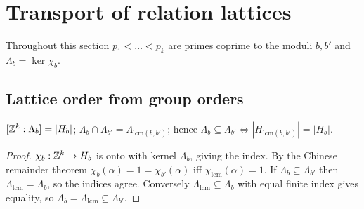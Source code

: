 \section{Transport of relation lattices}\label{sec:lattice}
Throughout this section $p_1<\dots<p_k$ are primes coprime to the moduli $b,b'$ and $\Lambda_b=\ker\chi_b$.

\subsection{Lattice order from group orders}
\begin{proposition}\label{prop:E22}
$[\mathbb Z^k:\Lambda_b]=|H_b|$; $\Lambda_b\cap\Lambda_{b'}=\Lambda_{\mathrm{lcm}(b,b')}$; hence $\Lambda_b\subseteq\Lambda_{b'}\iff|H_{\mathrm{lcm}(b,b')}|=|H_b|$.
\end{proposition}
\begin{proof}
$\chi_b:\mathbb Z^k\to H_b$ is onto with kernel $\Lambda_b$, giving the index. By the Chinese remainder theorem $\chi_b(\alpha)=1=\chi_{b'}(\alpha)$ iff $\chi_{\mathrm{lcm}}(\alpha)=1$. If $\Lambda_b\subseteq\Lambda_{b'}$ then $\Lambda_{\mathrm{lcm}}=\Lambda_b$, so the indices agree. Conversely $\Lambda_{\mathrm{lcm}}\subseteq\Lambda_b$ with equal finite index gives equality, so $\Lambda_b=\Lambda_{\mathrm{lcm}}\subseteq\Lambda_{b'}$. \qedhere
\end{proof}


